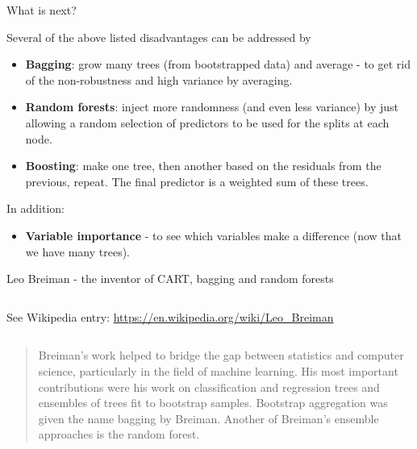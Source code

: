 \documentclass[10pt,ignorenonframetext,]{beamer}
\providecommand{\tightlist}{%
  \setlength{\itemsep}{0pt}\setlength{\parskip}{0pt}}
\begin{document}
\begin{frame}

\begin{block}{What is next?}

\vspace{2mm}

Several of the above listed disadvantages can be addressed by
\vspace{2mm}

\begin{itemize}
\item
  \textbf{Bagging}: grow many trees (from bootstrapped data) and average
  - to get rid of the non-robustness and high variance by averaging.
\item
  \textbf{Random forests}: inject more randomness (and even less
  variance) by just allowing a random selection of predictors to be used
  for the splits at each node.
\item
  \textbf{Boosting}: make one tree, then another based on the residuals
  from the previous, repeat. The final predictor is a weighted sum of
  these trees.
\end{itemize}

\vspace{2mm}

In addition:

\vspace{2mm}

\begin{itemize}
\tightlist
\item
  \textbf{Variable importance} - to see which variables make a
  difference (now that we have many trees).
\end{itemize}

\end{block}

\end{frame}

\begin{frame}

\begin{block}{Leo Breiman - the inventor of CART, bagging and random
forests}

\(~\)

\vspace{1mm}

See Wikipedia entry: \url{https://en.wikipedia.org/wiki/Leo_Breiman}

\vspace{1mm}

\(~\)

\begin{quote}
Breiman's work helped to bridge the gap between statistics and computer science, particularly in the field of machine learning. His most important contributions were his work on classification and regression trees and ensembles of trees fit to bootstrap samples. Bootstrap aggregation was given the name bagging by Breiman. Another of Breiman's ensemble approaches is the random forest. 
\end{quote}

\end{block}

\end{frame}
\end{document}
